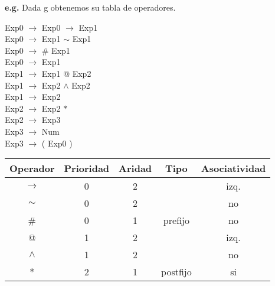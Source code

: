 \documentclass[\main/ApuntesPL.tex]{subfiles}
\begin{document}
      \par
      \textbf{e.g.} Dada g obtenemos su tabla de operadores.\\
      \begin{minipage}{.4\textwidth}
        \hspace*{10mm}Exp0 $\rightarrow$ Exp0 $\rightarrow$ Exp1\\
        \hspace*{10mm}Exp0 $\rightarrow$ Exp1 $\sim$ Exp1\\
        \hspace*{10mm}Exp0 $\rightarrow$ \# Exp1\\
        \hspace*{10mm}Exp0 $\rightarrow$ Exp1\\
        \hspace*{10mm}Exp1 $\rightarrow$ Exp1 @ Exp2\\
        \hspace*{10mm}Exp1 $\rightarrow$ Exp2 $\wedge$ Exp2\\
        \hspace*{10mm}Exp1 $\rightarrow$ Exp2\\
        \hspace*{10mm}Exp2 $\rightarrow$ Exp2 $\ast$\\
        \hspace*{10mm}Exp2 $\rightarrow$ Exp3\\
        \hspace*{10mm}Exp3 $\rightarrow$ Num\\
        \hspace*{10mm}Exp3 $\rightarrow$ ( Exp0 )\\
      \end{minipage}%
      \begin{minipage}{.6\textwidth}
        \begin{tabular}{||c c c c c||}
          \hline
          Operador & Prioridad & Aridad & Tipo & Asociatividad \\ [0.5ex]
          \hline\hline
          $\rightarrow$ & 0 & 2 &  & izq. \\
          \hline
          $\sim$ & 0 & 2 &  & no \\
          \hline
          \# & 0 & 1 & prefijo & no \\
          \hline
          @ & 1 & 2 &  & izq. \\
          \hline
          $\wedge$ & 1 & 2 &  & no \\
          \hline
          $\ast$ & 2 & 1 & postfijo & si \\ [1ex]
          \hline
        \end{tabular}
      \end{minipage}
\end{document}
